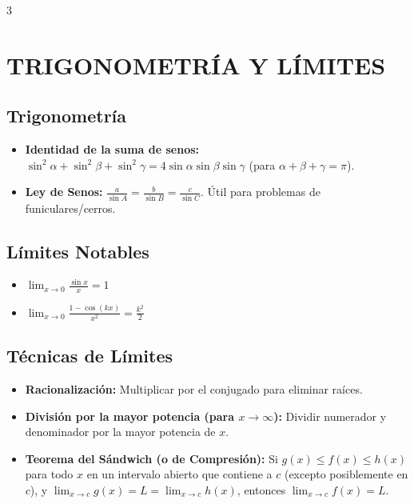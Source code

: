 \documentclass[8pt,letterpaper]{article}
\begin{document}
\begin{multicols*}{3}

\section*{TRIGONOMETRÍA Y LÍMITES}

\subsection*{Trigonometría}
\begin{itemize}
    \item \textbf{Identidad de la suma de senos:}
    $\sin^2\alpha + \sin^2\beta + \sin^2\gamma = 4\sin\alpha\sin\beta\sin\gamma$ (para $\alpha+\beta+\gamma=\pi$).
    \item \textbf{Ley de Senos:}
    $\frac{a}{\sin A} = \frac{b}{\sin B} = \frac{c}{\sin C}$. Útil para problemas de funiculares/cerros.
\end{itemize}

\subsection*{Límites Notables}
\begin{itemize}
    \item $\lim_{x\to 0} \frac{\sin x}{x} = 1$
    \item $\lim_{x\to 0} \frac{1 - \cos(kx)}{x^2} = \frac{k^2}{2}$
\end{itemize}

\subsection*{Técnicas de Límites}
\begin{itemize}
    \item \textbf{Racionalización:} Multiplicar por el conjugado para eliminar raíces.
    \item \textbf{División por la mayor potencia (para $x \to \infty$):}
    Dividir numerador y denominador por la mayor potencia de $x$.
    \item \textbf{Teorema del Sándwich (o de Compresión):}
    Si $g(x) \le f(x) \le h(x)$ para todo $x$ en un intervalo abierto que contiene a $c$ (excepto posiblemente en $c$), y $\lim_{x\to c} g(x) = L = \lim_{x\to c} h(x)$, entonces $\lim_{x\to c} f(x) = L$.
\end{itemize}


\end{multicols*}
\end{document}
